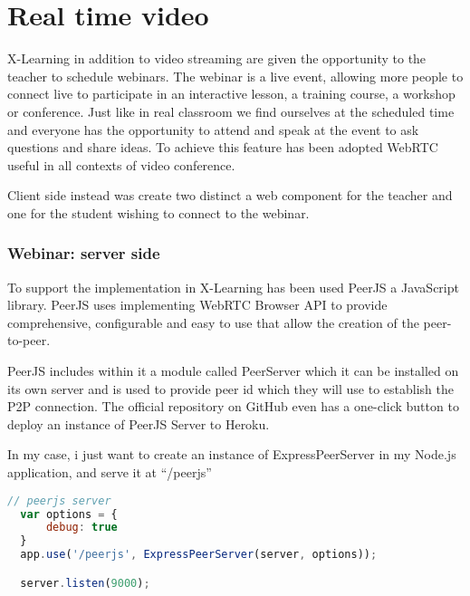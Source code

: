 \newpage
\section{Real time video}
\label{sec:RealTimeVideo}

X-Learning in addition to video streaming are given the opportunity to the teacher to schedule webinars.
The webinar is a live event, allowing more people to connect live to participate in an interactive lesson, a training course, a workshop or conference. Just like in real classroom we find ourselves at the scheduled time and everyone has the opportunity to attend and speak at the event to ask questions and share ideas.
To achieve this feature has been adopted WebRTC useful in all contexts of video conference.


Client side instead was create two distinct a web component for the teacher and one for the student wishing to connect to the webinar.

\subsubsection{Webinar: server side}
To support the implementation in X-Learning has been used PeerJS a JavaScript library.
PeerJS uses implementing WebRTC Browser API to provide comprehensive, configurable and easy to use that allow the creation of the peer-to-peer. 



PeerJS includes within it a module called PeerServer which it can be installed on its own server and is used to provide peer id which they will use to establish the P2P connection. The official repository on GitHub even has a one-click button to deploy an instance of PeerJS Server to Heroku.

In my case, i just want to create an instance of ExpressPeerServer in my Node.js application, and serve it at “/peerjs”

\begin{lstlisting}[language=javascript]
// peerjs server
  var options = {
      debug: true
  }
  app.use('/peerjs', ExpressPeerServer(server, options));

  server.listen(9000);
\end{lstlisting}

